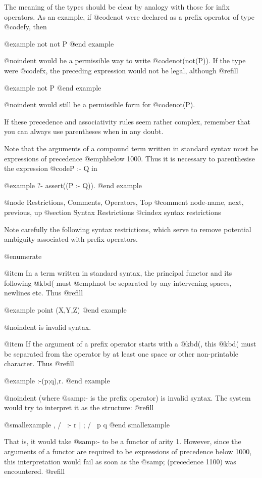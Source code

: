 {The meaning of the types should be clear by analogy with those for infix
operators.  As an example, if @code{not} were declared as a prefix
operator of type @code{fy}, then

@example
not not P
@end example

@noindent
would be a permissible way to write @code{not(not(P))}.  If the type
were @code{fx}, the preceding expression would not be legal, although
@refill

@example
not P
@end example

@noindent
would still be a permissible form for @code{not(P)}.

If these precedence and associativity rules seem rather complex,
remember that you can always use parentheses when in any doubt.

Note that the arguments of a compound term written in standard syntax
must be expressions of precedence @emph{below} 1000.  Thus it is
necessary to parenthesise the expression @code{P :- Q} in

@example
?- assert((P :- Q)).
@end example

@node Restrictions, Comments, Operators, Top
@comment  node-name,  next,  previous,  up
@section Syntax Restrictions
@cindex syntax restrictions

Note carefully the following syntax restrictions, which serve to remove
potential ambiguity associated with prefix operators.

@enumerate

@item
In a term written in standard syntax, the principal functor and its
following @kbd{(} must @emph{not} be separated by any intervening spaces,
newlines etc.  Thus @refill

@example
point (X,Y,Z)
@end example

@noindent
is invalid syntax.

@item
If the argument of a prefix operator starts with a @kbd{(}, this @kbd{(}
must be separated from the operator by at least one space or other
non-printable character.  Thus @refill

@example
:-(p;q),r.
@end example

@noindent
(where @samp{:-} is the prefix operator) is invalid syntax.  The system
would try to interpret it as the structure: @refill

@smallexample
    ,
   / \
 :-    r
  |
  ;
 / \
p   q
@end smallexample

That is, it would take @samp{:-} to be a functor of arity 1.  However,
since the arguments of a functor are required to be expressions of
precedence below 1000, this interpretation would fail as soon as the
@samp{;} (precedence 1100) was encountered. @refill

}
